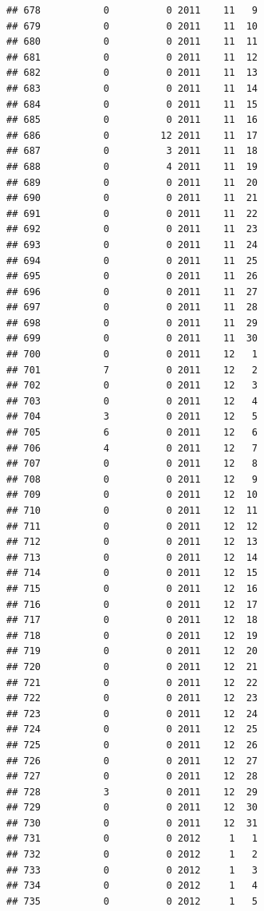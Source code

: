 \documentclass[
]{article}
\begin{document}
\begin{verbatim}
## 678           0          0 2011    11   9
## 679           0          0 2011    11  10
## 680           0          0 2011    11  11
## 681           0          0 2011    11  12
## 682           0          0 2011    11  13
## 683           0          0 2011    11  14
## 684           0          0 2011    11  15
## 685           0          0 2011    11  16
## 686           0         12 2011    11  17
## 687           0          3 2011    11  18
## 688           0          4 2011    11  19
## 689           0          0 2011    11  20
## 690           0          0 2011    11  21
## 691           0          0 2011    11  22
## 692           0          0 2011    11  23
## 693           0          0 2011    11  24
## 694           0          0 2011    11  25
## 695           0          0 2011    11  26
## 696           0          0 2011    11  27
## 697           0          0 2011    11  28
## 698           0          0 2011    11  29
## 699           0          0 2011    11  30
## 700           0          0 2011    12   1
## 701           7          0 2011    12   2
## 702           0          0 2011    12   3
## 703           0          0 2011    12   4
## 704           3          0 2011    12   5
## 705           6          0 2011    12   6
## 706           4          0 2011    12   7
## 707           0          0 2011    12   8
## 708           0          0 2011    12   9
## 709           0          0 2011    12  10
## 710           0          0 2011    12  11
## 711           0          0 2011    12  12
## 712           0          0 2011    12  13
## 713           0          0 2011    12  14
## 714           0          0 2011    12  15
## 715           0          0 2011    12  16
## 716           0          0 2011    12  17
## 717           0          0 2011    12  18
## 718           0          0 2011    12  19
## 719           0          0 2011    12  20
## 720           0          0 2011    12  21
## 721           0          0 2011    12  22
## 722           0          0 2011    12  23
## 723           0          0 2011    12  24
## 724           0          0 2011    12  25
## 725           0          0 2011    12  26
## 726           0          0 2011    12  27
## 727           0          0 2011    12  28
## 728           3          0 2011    12  29
## 729           0          0 2011    12  30
## 730           0          0 2011    12  31
## 731           0          0 2012     1   1
## 732           0          0 2012     1   2
## 733           0          0 2012     1   3
## 734           0          0 2012     1   4
## 735           0          0 2012     1   5

\end{verbatim}
\end{document}
